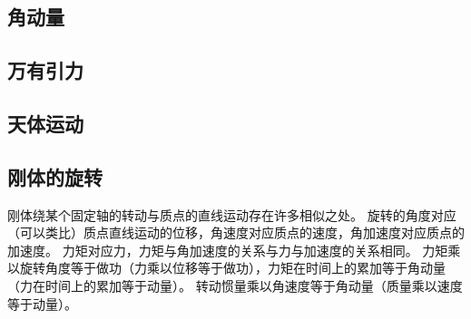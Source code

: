 
\begin{issues}
\issueDraft
\end{issues}

\subsection{角动量}

\subsection{万有引力}

\subsection{天体运动}

\subsection{刚体的旋转}
刚体绕某个固定轴的转动与质点的直线运动存在许多相似之处。 旋转的角度对应（可以类比）质点直线运动的位移，角速度对应质点的速度，角加速度对应质点的加速度。 力矩对应力，力矩与角加速度的关系与力与加速度的关系相同。 力矩乘以旋转角度等于做功（力乘以位移等于做功），力矩在时间上的累加等于角动量（力在时间上的累加等于动量）。 转动惯量乘以角速度等于角动量（质量乘以速度等于动量）。

